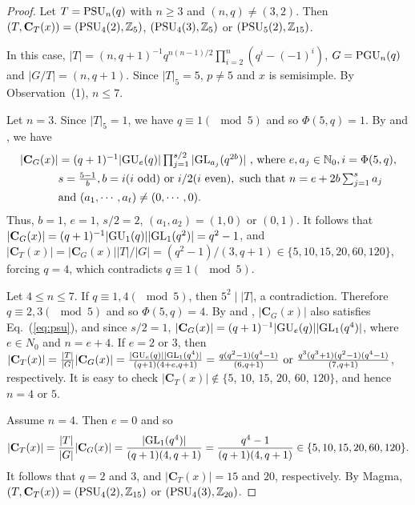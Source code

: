 \documentclass[12pt,reqno]{amsart}
\def\C{\mathbf{C}}   \newcommand\Cay{\mathrm{Cay}}   \newcommand\Cos{\mathrm{Cos}} \newcommand{\CGammaSp}{\mathrm{C\Gamma Sp}}
\numberwithin {equation} {section}
\begin{document}
\begin{proof}
\smallskip

 Let $T=\mathrm{PSU}_n(q)$ with $n \geq 3$ and $(n,q) \neq (3,2)$. Then $(T,\C_T(x))=(\PSU_4(2),\ZZ_{5})$, $(\mathrm{PSU}_4(3),\mathbb{Z}_{5})$ or $(\mathrm{PSU}_5(2),\mathbb{Z}_{15})$. \label{psu}

In this case, $|T|=  (n,q+1)^{-1}q^{n(n-1)/2}\prod_{i=2}^{n}(q^i-(-1)^i)$, $G=\mathrm{PGU}_n(q)$ and $|G/T|=(n,q+1)$.
 Since $|T|_5=5$, $p\neq 5$ and $x$ is semisimple. By Observation~(1), $n\leq 7$.


Let $n=3$. Since $|T|_5=1$, we have  $q \equiv 1(\mod 5)$ and so $\Phi(5,q)=1$. By \cite[Table B.4]{B-G} and \cite[Proposition 3.3.2(i)]{B-G}, we have
 \begin{equation}\label{eq:psu}
 \begin{split}
 \textstyle |\C_G(x)|&  =\textstyle{(q+1)^{-1}|\GU_e(q)|\prod_{j=1}^{s/2}|\GL_{a_j}(q^{2b})|}  ~\text{,~where~} e,a_j \in \mathbb{N}_0, i=\Phi(5,q),   \\
  & \textstyle{s=\frac{5-1}{b}}, b=i(i\text{~odd}) \text{~or~} i/2 (i\text{~even}), \text{~such~that~} \textstyle{n=e+2b\sum_{j=1}^{s}a_j } \\ &\text{and~} (a_1,\cdots,a_t) \neq (0,\cdots,0).
\end{split}
 \end{equation}
Thus, $b=1$, $e=1$, $s/2=2$, $(a_1,a_2)=(1,0)$ or $(0,1)$. It follows that   $|\C_G(x)|=(q+1)^{-1}|\GU_1(q)||\GL_1(q^2)|=q^2-1$, and $|\C_T(x)|=|\C_G(x)||T|/|G|=(q^2-1)/(3,q+1)\in \{5,10,15,20,60,120 \}$, forcing $q=4$, which contradicts $q \equiv 1(\mod 5)$.

Let $4\leq n \leq 7$. If $q \equiv 1,4(\mod 5)$, then $5^2 \mid |T|$, a contradiction. Therefore $q \equiv 2,3(\mod 5)$ and so $\Phi(5,q)=4$.
By \cite[Table B.4]{B-G} and \cite[Proposition 3.3.2(i)]{B-G}, $|\C_G(x)|$ also satisfies Eq.~(\ref{eq:psu}), and since $s/2=1$, $|\C_G(x)|=(q+1)^{-1}|\GU_e(q)||\GL_{1} (q^4)|$, where $e \in N_0$ and $n=e+4 $.
If $e=2$ or $3$, then
$|\C_T(x)|=\frac{|T|}{|G|}|\C_G(x)|=\frac{|\GU_e(q)||\GL_1(q^4)|}{(q+1)(4+e,q+1)}=\frac{q(q^2-1)(q^4-1)}{(6,q+1)} \text{~or~}\frac{q^3(q^3+1)(q^2-1)(q^4-1)}{(7,q+1)}$,
respectively. It is easy to check
$|\C_T(x)| \notin \{5$, $10$, $15$, $20$, $60$, $120\}$, and hence $n=4$ or $5$.

Assume $n=4$. Then $e =0$ and so
\[ |\C_T(x)|=\frac{|T|}{|G|}|\C_G(x)|=\frac{|\GL_1(q^4)|}{(q+1)(4,q+1)}=\frac{q^4-1}{(q+1)(4,q+1)}\in \{5,10,15,20,60,120 \}.\]
It follows that $q=2$ and $3$, and $|\C_T(x)|=15$ and $20$, respectively. By {\sc Magma},  $(T,\C_T(x))=(\PSU_4(2),\ZZ_{15})$ or $(\mathrm{PSU}_4(3),\mathbb{Z}_{20})$.


\end{proof}
\end{document}

